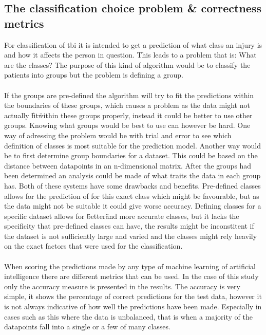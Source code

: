 \documentclass[11pt]{article}
\begin{document}
\subsection{The classification choice problem \& correctness metrics}
For classification of \gls{tbi} it is intended to get a prediction of what class an injury is and how it affects the person in question. This leads to a problem that is: What are the classes? The purpose of this kind of algorithm would be to classify the patients into groups but the problem is defining a group.\\
\\
If the groups are pre-defined the algorithm will try to fit the predictions within the boundaries of these groups, which causes a problem as the data might not actually \"fit\" within these groups properly, instead it could be better to use other groups. Knowing what groups would be best to use can however be hard. One way of adressing the problem would be with trial and error to see which definition of classes is most suitable for the prediction model. Another way would be to first determine group boundaries for a dataset. This could be based on the distance between datapoints in an n-dimensional matrix. After the groups had been determined an analysis could be made of what traits the data in each group has. Both of these systems have some drawbacks and benefits. Pre-defined classes allows for the prediction of for this exact class which might be favourable, but as the data might not be suitable it could give worse accuracy. Defining classes for a specific dataset allows for \"better\" and more accurate classes, but it lacks the specificity that pre-defined classes can have, the results might be inconstitent if the dataset is not sufficiently large and varied and the classes might rely heavily on the exact factors that were used for the classification.\\
\\
When scoring the predictions made by any type of machine learning of artificial intelligence there are different metrics that can be used. In the case of this study only the accuracy measure is presented in the results. The accuracy is very simple, it shows the percentage of correct predictions for the test data, however it is not always indicative of how well the predictions have been made. Especially in cases such as this where the data is unbalanced, that is when a majority of the datapoints fall into a single or a few of many classes.\\
\\
\end{document}

